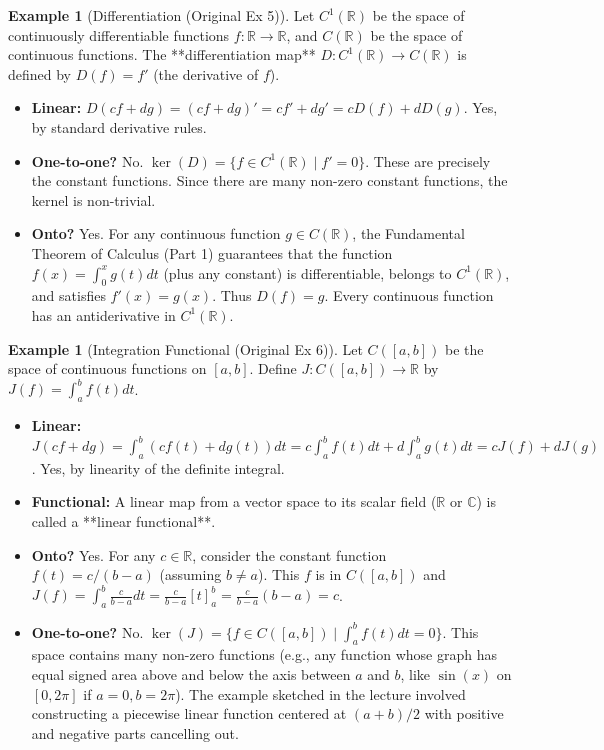 \documentclass[11pt]{article}
\theoremstyle{definition}
\newtheorem{example}[theorem]{Example}
\theoremstyle{remark}
\newcommand{\R}{\mathbb{R}}
\newcommand{\C}{\mathbb{C}}
\begin{document}
\begin{example}[Differentiation (Original Ex 5)]
    Let $C^1(\R)$ be the space of continuously differentiable functions $f: \R \to \R$, and $C(\R)$ be the space of continuous functions. The **differentiation map** $D: C^1(\R) \to C(\R)$ is defined by $D(f) = f'$ (the derivative of $f$).
    \begin{itemize}
        \item \textbf{Linear:} $D(cf + dg) = (cf+dg)' = cf' + dg' = cD(f) + dD(g)$. Yes, by standard derivative rules.
        \item \textbf{One-to-one?} No. $\ker(D) = \{f \in C^1(\R) \mid f' = 0\}$. These are precisely the constant functions. Since there are many non-zero constant functions, the kernel is non-trivial.
        \item \textbf{Onto?} Yes. For any continuous function $g \in C(\R)$, the Fundamental Theorem of Calculus (Part 1) guarantees that the function $f(x) = \int_0^x g(t) dt$ (plus any constant) is differentiable, belongs to $C^1(\R)$, and satisfies $f'(x) = g(x)$. Thus $D(f) = g$. Every continuous function has an antiderivative in $C^1(\R)$.
    \end{itemize}
\end{example}

\begin{example}[Integration Functional (Original Ex 6)]
    Let $C([a,b])$ be the space of continuous functions on $[a,b]$. Define $J: C([a,b]) \to \R$ by $J(f) = \int_a^b f(t) dt$.
    \begin{itemize}
        \item \textbf{Linear:} $J(cf+dg) = \int_a^b (cf(t)+dg(t)) dt = c\int_a^b f(t) dt + d\int_a^b g(t) dt = cJ(f) + dJ(g)$. Yes, by linearity of the definite integral.
        \item \textbf{Functional:} A linear map from a vector space to its scalar field ($\R$ or $\C$) is called a **linear functional**.
        \item \textbf{Onto?} Yes. For any $c \in \R$, consider the constant function $f(t) = c/(b-a)$ (assuming $b \neq a$). This $f$ is in $C([a,b])$ and $J(f) = \int_a^b \frac{c}{b-a} dt = \frac{c}{b-a} [t]_a^b = \frac{c}{b-a} (b-a) = c$.
        \item \textbf{One-to-one?} No. $\ker(J) = \{f \in C([a,b]) \mid \int_a^b f(t) dt = 0\}$. This space contains many non-zero functions (e.g., any function whose graph has equal signed area above and below the axis between $a$ and $b$, like $\sin(x)$ on $[0, 2\pi]$ if $a=0, b=2\pi$). The example sketched in the lecture involved constructing a piecewise linear function centered at $(a+b)/2$ with positive and negative parts cancelling out.
    \end{itemize}
\end{example}
\end{document}
